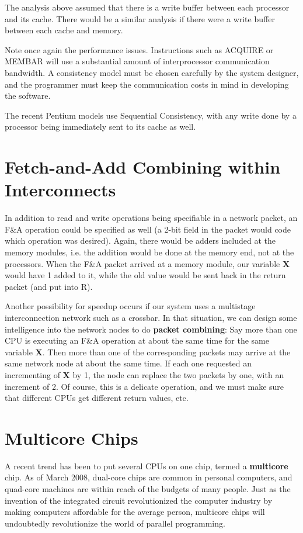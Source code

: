 The analysis above assumed that there is a write buffer between each
processor and its cache.  There would be a similar analysis if there
were a write buffer between each cache and memory.

Note once again the performance issues.  Instructions such as ACQUIRE or
MEMBAR will use a substantial amount of interprocessor communication
bandwidth.  A consistency model must be chosen carefully by the system
designer, and the programmer must keep the communication costs in mind
in developing the software.  

The recent Pentium models use Sequential Consistency, with any write
done by a processor being immediately sent to its cache as well.

\section{Fetch-and-Add Combining within Interconnects}

In addition to read and write operations being specifiable in a network
packet, an F\&A operation could be specified as well (a 2-bit field in
the packet would code which operation was desired). Again, there would
be adders included at the memory modules, i.e. the addition would be
done at the memory end, not at the processors. When the F\&A packet
arrived at a memory module, our variable  {\bf X} would have 1 added to
it, while the old value would be sent back in the return packet (and put
into R).

Another possibility for speedup occurs if our system uses a multistage
interconnection network such as a crossbar.  In that situation, we can
design some intelligence into the network nodes to do {\bf packet
combining}: Say more than one CPU is executing an F\&A operation at
about the same time for the same variable {\bf X}.  Then more than one
of the corresponding packets may arrive at the same network node at
about the same time.  If each one requested an incrementing of {\bf X}
by 1, the node can replace the two packets by one, with an increment of
2.  Of course, this is a delicate operation, and we must make sure that
different CPUs get different return values, etc.

\section{Multicore Chips}

A recent trend has been to put several CPUs on one chip, termed a {\bf
multicore} chip.  As of March 2008, dual-core chips are common in
personal computers, and quad-core machines are within reach of the
budgets of many people.  Just as the invention of the integrated circuit
revolutionized the computer industry by making computers affordable for
the average person, multicore chips will undoubtedly revolutionize the
world of parallel programming.

